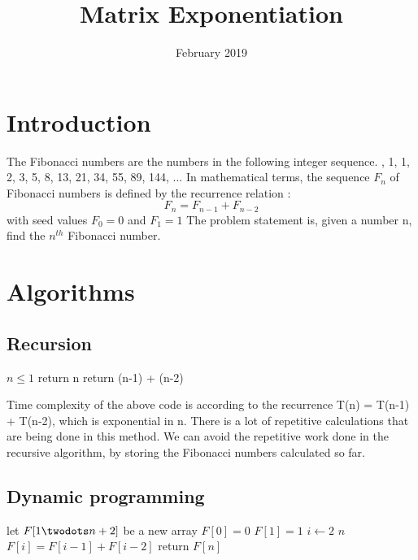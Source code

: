\documentclass{article}
\title{Matrix Exponentiation}
\date{February 2019}
\begin{document}
\maketitle

\section{Introduction}
The Fibonacci numbers are the numbers in the following integer sequence. , 1, 1, 2, 3, 5, 8, 13, 21, 34, 55, 89, 144, ...
\newline
In mathematical terms, the sequence $F_n$ of Fibonacci numbers is defined by the recurrence relation : \newline
\[F_n = F_{n-1} + F_{n-2}\]
with seed values $F_0 = 0$ and $F_1 = 1$
\newline The problem statement is, given a number n, find the $n^{th}$ Fibonacci number. 

\section{Algorithms}
\subsection{Recursion}

\begin{codebox}
\li \If $n \leq 1$
\li     \Do return n \End
\li return (n-1) + (n-2)
\end{codebox}

Time complexity of the above code is according to the recurrence T(n) = T(n-1) + T(n-2), which is exponential in n. There is a lot of repetitive calculations that are being done in this method. We can avoid the repetitive work done in the recursive algorithm, by storing the Fibonacci numbers calculated so far.

\subsection{Dynamic programming}

\begin{codebox}
\li let $F[1 \twodots n+2]$ be a new array
\li $F[0] = 0$
\li $F[1] = 1$
\li \For $i \gets 2$ \To $n$
\li \Do $F[i] = F[i-1] + F[i-2]$\End
\li return $F[n]$
\end{codebox}
\end{document}
